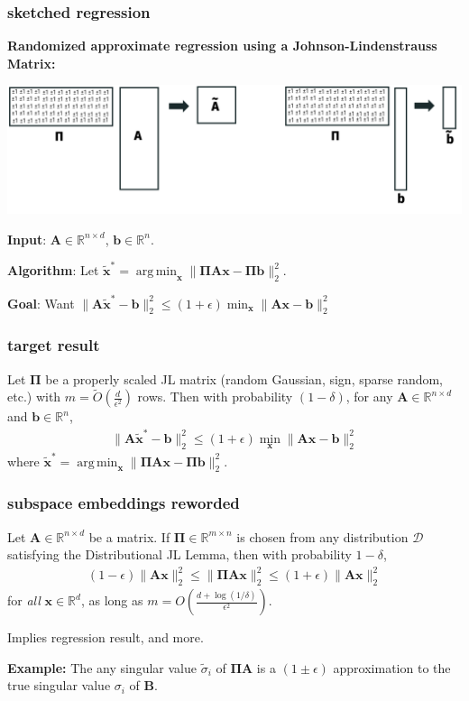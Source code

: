 \documentclass[compress]{beamer}
\newcommand{\bs}[1]{\boldsymbol{#1}}
\newcommand{\bv}[1]{\mathbf{#1}}
\newcommand{\R}{\mathbb{R}}
\DeclareMathOperator*{\argmin}{arg\,min}
\begin{document}
\begin{frame}[t]
	\frametitle{sketched regression}
	\textbf{Randomized approximate regression using a Johnson-Lindenstrauss Matrix:}
	\begin{center}
		\includegraphics[width=.8\textwidth]{jlRegression.png}
	\end{center}
\vspace{-1em}
	\textbf{Input}: $\bv{A} \in \R^{n\times d}$, $\bv{b} \in \R^{n}$. 
	
	\textbf{Algorithm}: Let $\tilde{\bv{x}}^* = \argmin_{\bv{x}} \|\bs{\Pi}\bv{A}\bv{x} - \bs{\Pi}\bv{b}\|_2^2$.
	
	\textbf{Goal}: Want $\|\bv{A}\tilde{\bv{x}}^* - \bv{b}\|_2^2 \leq (1+\epsilon) \min_{\bv{x}} \|\bv{A}\bv{x} - \bv{b}\|_2^2$
\end{frame}

\begin{frame}[t]
	\frametitle{target result}
	\begin{theorem}
		Let $\bs{\Pi}$ be a properly scaled JL matrix (random Gaussian, sign, sparse random, etc.) with $m = \tilde{O}\left(\frac{d}{\epsilon^2}\right)$ rows. Then with probability $(1-\delta)$, for any $\bv{A}\in \R^{n\times d}$ and $\bv{b}\in \R^n$,
		\begin{align*}
		\|\bv{A}\tilde{\bv{x}}^* - \bv{b}\|_2^2 \leq (1+\epsilon) \min_{\bv{x}} \|\bv{A}\bv{x} - \bv{b}\|_2^2
		\end{align*}
		where $\tilde{\bv{x}}^* = \argmin_{\bv{x}} \|\bs{\Pi}\bv{A}\bv{x} - \bs{\Pi}\bv{b}\|_2^2$.
	\end{theorem}
\end{frame}

\begin{frame}
	\frametitle{subspace embeddings reworded}
	\begin{theorem}
		Let $\bv{A} \in \R^{n\times d}$ be a matrix. If $\bs{\Pi}\in \R^{m\times n}$ is chosen from any distribution $\mathcal{D}$ satisfying the Distributional JL Lemma, then with probability $1-\delta$,
		\begin{align*}
			(1-\epsilon)\|\bv{A}\bv{x}\|_2^2 \leq \|\bs{\Pi} \bv{A} \bv{x}\|_2^2 \leq	(1+\epsilon)\|\bv{A}\bv{x}\|_2^2
		\end{align*}
		for \emph{all} $\bv{x} \in \R^d$, as long as  $m = {O}\left(\frac{d + \log(1/\delta)}{\epsilon^2}\right)$.
	\end{theorem}
Implies regression result, and more. 

\textbf{Example:} The any singular value $\tilde{\sigma}_i$ of $\bs{\Pi}\bv{A}$ is a $(1\pm \epsilon)$ approximation to the true singular value ${\sigma}_i$ of  $\bv{B}$. 
\end{frame}
\end{document}
